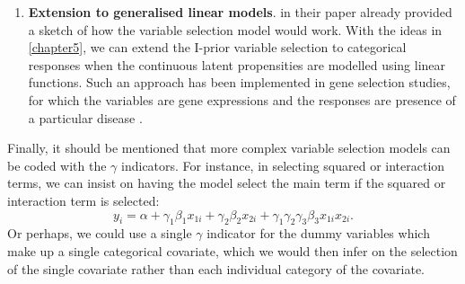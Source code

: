 \documentclass[11pt,twoside,openright]{report}
\begin{document}
\begin{enumerate}
  \item \textbf{Extension to generalised linear models}.
  \citet{Kuo1998} in their paper already provided a sketch of how the variable selection model would work.
  With the ideas in \cref{chapter5}, we can extend the I-prior variable selection to categorical responses when the continuous latent propensities are modelled using linear functions.
  Such an approach has been implemented in gene selection studies, for which the variables are gene expressions and the responses are presence of a particular disease \citep{lee2003gene}.
\end{enumerate}

Finally, it should be mentioned that more complex variable selection models can be coded with the $\gamma$ indicators.
For instance, in selecting squared or interaction terms, we can insist on having the model select the main term if the squared or interaction term is selected:
\[
  y_i = \alpha + \gamma_1 \beta_1 x_{1i} + \gamma_2 \beta_2 x_{2i} + \gamma_1 \gamma_2\gamma_3 \beta_3 x_{1i}x_{2i}.
\]
Or perhaps, we could use a single $\gamma$ indicator for the dummy variables which make up a single categorical covariate, which we would then infer on the selection of the single covariate rather than each individual category of the covariate.



\hClosingStuffStandalone
\end{document}
